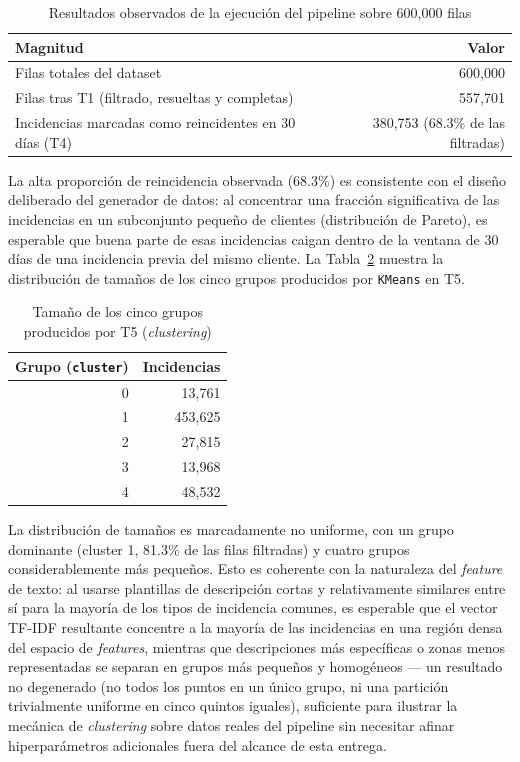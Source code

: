 \documentclass[11pt,letterpaper]{article}
\begin{document}
\begin{table}[H]
\centering
\caption{Resultados observados de la ejecución del pipeline sobre 600{,}000 filas}
\label{tab:pipeline-resultados}
\begin{tabular}{@{}lr@{}}
\toprule
\textbf{Magnitud} & \textbf{Valor} \\
\midrule
Filas totales del dataset & 600{,}000 \\
Filas tras T1 (filtrado, resueltas y completas) & 557{,}701 \\
Incidencias marcadas como reincidentes en 30 días (T4) & 380{,}753 (68.3\% de las filtradas) \\
\bottomrule
\end{tabular}
\end{table}

La alta proporción de reincidencia observada (68.3\%) es consistente con el diseño deliberado del
generador de datos: al concentrar una fracción significativa de las incidencias en un subconjunto
pequeño de clientes (distribución de Pareto), es esperable que buena parte de esas incidencias
caigan dentro de la ventana de 30 días de una incidencia previa del mismo cliente. La
Tabla~\ref{tab:clustering-resultados} muestra la distribución de tamaños de los cinco grupos
producidos por \texttt{KMeans} en T5.

\begin{table}[H]
\centering
\caption{Tamaño de los cinco grupos producidos por T5 (\emph{clustering})}
\label{tab:clustering-resultados}
\begin{tabular}{@{}rr@{}}
\toprule
\textbf{Grupo (\texttt{cluster})} & \textbf{Incidencias} \\
\midrule
0 & 13{,}761 \\
1 & 453{,}625 \\
2 & 27{,}815 \\
3 & 13{,}968 \\
4 & 48{,}532 \\
\bottomrule
\end{tabular}
\end{table}

La distribución de tamaños es marcadamente no uniforme, con un grupo dominante (cluster 1,
81.3\% de las filas filtradas) y cuatro grupos considerablemente más pequeños. Esto es coherente
con la naturaleza del \emph{feature} de texto: al usarse plantillas de descripción cortas y
relativamente similares entre sí para la mayoría de los tipos de incidencia comunes, es esperable
que el vector TF-IDF resultante concentre a la mayoría de las incidencias en una región densa del
espacio de \emph{features}, mientras que descripciones más específicas o zonas menos representadas
se separan en grupos más pequeños y homogéneos — un resultado no degenerado (no todos los puntos
en un único grupo, ni una partición trivialmente uniforme en cinco quintos iguales), suficiente
para ilustrar la mecánica de \emph{clustering} sobre datos reales del pipeline sin necesitar
afinar hiperparámetros adicionales fuera del alcance de esta entrega.
\end{document}
